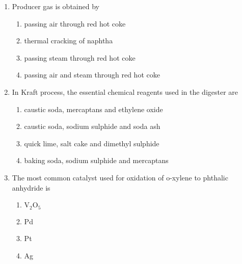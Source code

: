 \documentclass[12pt]{article}
\begin{document}
\begin{enumerate}[label=Q.\arabic*]
		\begin{center}{
				\texttt{[image: ch\_q16.jpg]}
		}\end{center}

		If heat losses are neglected, and if both the designs are feasible, which of the following statements holds true:

		\begin{multicols}{2}
			\begin{enumerate}[label=(\Alph*)]
				\item $A_{HX2} > A_{HX1}$ \quad $T_{out} < T_{out}''$
				\item $A_{HX2} = A_{HX1}$ \quad $T_{out} = T_{out}''$
				\item $A_{HX2} < A_{HX1}$ \quad $T_{out} > T_{out}''$
				\item $A_{HX2} < A_{HX1}$ \quad $T_{out} = T_{out}''$
			\end{enumerate}
		\end{multicols}

	\item Producer gas is obtained by
		\begin{multicols}{2}
			\begin{enumerate}[label=(\Alph*)]
				\item passing air through red hot coke
				\item thermal cracking of naphtha
				\item passing steam through red hot coke
				\item passing air and steam through red hot coke
			\end{enumerate}
		\end{multicols}

	\item In Kraft process, the essential chemical reagents used in the digester are
		\begin{multicols}{2}
			\begin{enumerate}[label=(\Alph*)]
				\item caustic soda, mercaptans and ethylene oxide
				\item caustic soda, sodium sulphide and soda ash
				\item quick lime, salt cake and dimethyl sulphide
				\item baking soda, sodium sulphide and mercaptans
			\end{enumerate}
		\end{multicols}

	\item The most common catalyst used for oxidation of o-xylene to phthalic anhydride is
		\begin{multicols}{2}
			\begin{enumerate}[label=(\Alph*)]
				\item $\text{V}_2\text{O}_5$
				\item Pd
				\item Pt
				\item Ag
			\end{enumerate}
		\end{multicols}


\end{enumerate}
\end{document}
